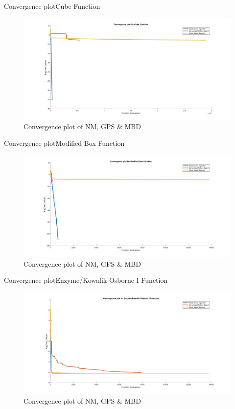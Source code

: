 \documentclass[10pt]{beamer}
\begin{document}
	\begin{frame}{Convergence plot}{Cube Function}
		\begin{figure}
			\includegraphics[width=\linewidth]{CubeConvF.jpg}
			\caption{Convergence plot of NM, GPS \& MBD}
		\end{figure}
	\end{frame}
	
	\begin{frame}{Convergence plot}{Modified Box Function}
		\begin{figure}
			\includegraphics[width=\linewidth]{mBoxConvF.jpg}
			\caption{Convergence plot of NM, GPS \& MBD}
		\end{figure}
	\end{frame}

	\begin{frame}{Convergence plot}{Enzyme/Kowalik Osborne I Function}
		\begin{figure}
			\includegraphics[width=\linewidth]{koConvF.jpg}
			\caption{Convergence plot of NM, GPS \& MBD}
		\end{figure}
	\end{frame}
	
\end{document}
